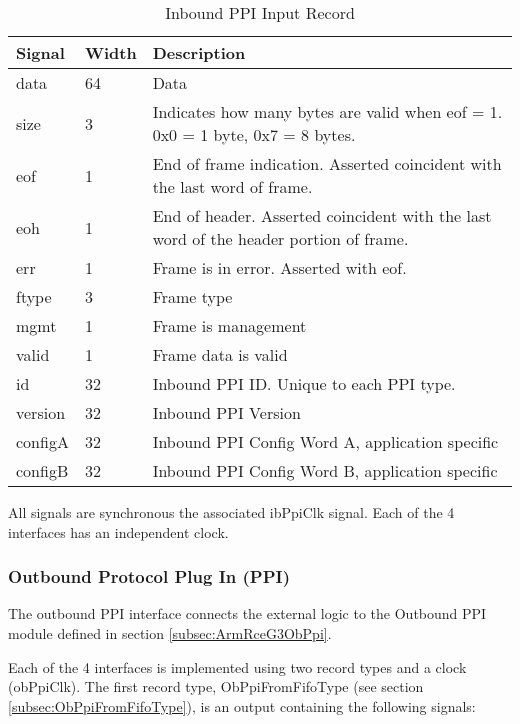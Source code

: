 \documentclass[11pt]{article}
\begin{document}
\begin{table}[H]
\small
\centering
   \begin{tabular}{| l | l | l | }
      \hline \textbf{Signal} & \textbf{Width}  & \textbf{Description} \\
      \hline data    & 64    & Data       \\
      \hline size    & 3     & Indicates how many bytes are valid when eof = 1. 0x0 = 1 byte, 0x7 = 8 bytes.       \\
      \hline eof     & 1     & End of frame indication. Asserted coincident with the last word of frame.       \\
      \hline eoh     & 1     & End of header. Asserted coincident with the last word of the header portion of frame.       \\
      \hline err     & 1     & Frame is in error. Asserted with eof.       \\
      \hline ftype   & 3     & Frame type       \\
      \hline mgmt    & 1     & Frame is management       \\
      \hline valid   & 1     & Frame data is valid       \\
      \hline id      & 32    & Inbound PPI ID. Unique to each PPI type. \\
      \hline version & 32    & Inbound PPI Version       \\
      \hline configA & 32    & Inbound PPI Config Word A, application specific       \\
      \hline configB & 32    & Inbound PPI Config Word B, application specific       \\
      \hline
   \end{tabular}
   \caption{Inbound PPI Input Record}
\end{table}

All signals are synchronous the associated ibPpiClk signal. Each of the 4 interfaces has an independent clock.

\subsubsection{Outbound Protocol Plug In (PPI)}
\label{subsubsec:external_ob_ppi}

The outbound PPI interface connects the external logic to the Outbound PPI module defined in section \ref{subsec:ArmRceG3ObPpi}.

Each of the 4 interfaces is implemented using two record types and a clock (obPpiClk). The first record type, ObPpiFromFifoType (see section \ref{subsec:ObPpiFromFifoType}), 
is an output containing the following signals:
\end{document}
